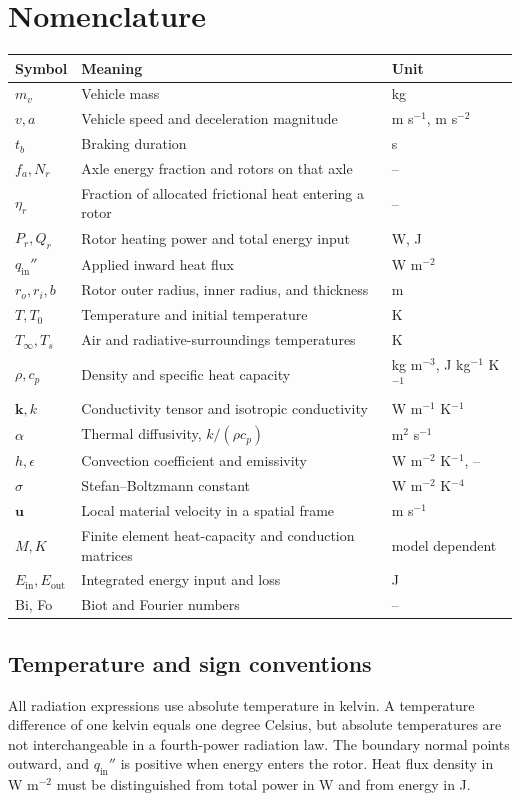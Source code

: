 \documentclass[11pt,a4paper]{article}
\begin{document}
\clearpage\section*{Nomenclature}
\begin{tabularx}{\textwidth}{@{}lXl@{}}\toprule
Symbol & Meaning & Unit\\\midrule
$m_v$ & Vehicle mass & kg\\
$v,a$ & Vehicle speed and deceleration magnitude & m s$^{-1}$, m s$^{-2}$\\
$t_b$ & Braking duration & s\\
$f_a,N_r$ & Axle energy fraction and rotors on that axle & --\\
$\eta_r$ & Fraction of allocated frictional heat entering a rotor & --\\
$P_r,Q_r$ & Rotor heating power and total energy input & W, J\\
$q_{\mathrm{in}}''$ & Applied inward heat flux & W m$^{-2}$\\
$r_o,r_i,b$ & Rotor outer radius, inner radius, and thickness & m\\
$T,T_0$ & Temperature and initial temperature & K\\
$T_\infty,T_s$ & Air and radiative-surroundings temperatures & K\\
$\rho,c_p$ & Density and specific heat capacity & kg m$^{-3}$, J kg$^{-1}$ K$^{-1}$\\
$\mathbf k,k$ & Conductivity tensor and isotropic conductivity & W m$^{-1}$ K$^{-1}$\\
$\alpha$ & Thermal diffusivity, $k/(\rho c_p)$ & m$^2$ s$^{-1}$\\
$h,\epsilon$ & Convection coefficient and emissivity & W m$^{-2}$ K$^{-1}$, --\\
$\sigma$ & Stefan--Boltzmann constant & W m$^{-2}$ K$^{-4}$\\
$\mathbf u$ & Local material velocity in a spatial frame & m s$^{-1}$\\
$M,K$ & Finite element heat-capacity and conduction matrices & model dependent\\
$E_{\mathrm{in}},E_{\mathrm{out}}$ & Integrated energy input and loss & J\\
Bi, Fo & Biot and Fourier numbers & --\\\bottomrule
\end{tabularx}

\subsection*{Temperature and sign conventions}
All radiation expressions use absolute temperature in kelvin. A temperature difference of one kelvin equals one degree Celsius, but absolute temperatures are not interchangeable in a fourth-power radiation law. The boundary normal points outward, and $q_{\mathrm{in}}''$ is positive when energy enters the rotor. Heat flux density in W m$^{-2}$ must be distinguished from total power in W and from energy in J.
\end{document}
